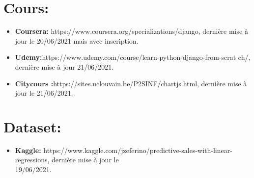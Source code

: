 \documentclass[a4paper]{report}
\begin{document}
\section{Cours:}
\begin{itemize}
	\item \textbf{Coursera:}
	      https://www.coursera.org/specializations/django, dernière mise à jour le
	      20/06/2021 mais avec inscription.

	\item\textbf{Udemy:}https://www.udemy.com/course/learn-python-django-from-scrat
	      ch/, dernière mise à jour 21/06/2021.
	\item \textbf{Citycours
		      :}https://sites.uclouvain.be/P2SINF/chartjs.html, dernière mise à jour le
	      21/06/2021.
\end{itemize}
\section{Dataset:}
\begin{itemize}
	\item \textbf{Kaggle:}
	      https://www.kaggle.com/jzeferino/predictive-sales-with-linear-regressions,
	      dernière mise à jour le\\ 19/06/2021.
\end{itemize}
\end{document}
